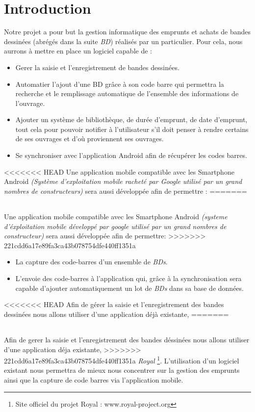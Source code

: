 \part*{Introduction}
Notre projet a pour but la gestion informatique des emprunts et achats de bandes dessinées (abrégés dans la suite \emph{BD}) réalisés par un particulier.
Pour cela, nous aurrons à mettre en place un logiciel capable de : 
\begin{itemize}
\item Gerer la saisie et l'enregistrement de bandes dessinées.
\item Automatier l'ajout d'une BD grâce à son code barre qui permettra la recherche et le remplissage automatique de l'ensemble des informations de l'ouvrage.
\item Ajouter un système de bibliothèque, de durée d'emprunt, de date d'emprunt, tout cela pour pouvoir notifier à l'utilisateur s'il doit penser à rendre certains de ses ouvrages et d'où proviennent ses ouvrages.
\item Se synchroniser avec l'application Android afin de récupérer les codes barres.
\end{itemize}

<<<<<<< HEAD
Une application mobile compatible avec les Smartphone Android \textit{(Système d'exploitation mobile racheté par Google utilisé par un grand nombres de constructeurs)} sera aussi développée afin de permettre :
=======

\paragraph{}
Une application mobile compatible avec les Smartphone Android \textit{(systeme d'éxploitation mobile développé par google utilisé par un grand nombres de constructeur)} sera aussi développée afin de permettre:
>>>>>>> 221cdd6a17e89fa3ca43b078754dfe440ff1351a
\begin{itemize}
\item La capture des code-barres d'un ensemble de \emph{BDs}.
\item L'envoie des code-barres à l'application qui, grâce à la synchronisation sera capable d'ajouter automatiquement un lot de \emph{BDs} dans sa base de données.
\end{itemize}

<<<<<<< HEAD
Afin de gérer la saisie et l'enregistrement des bandes dessinées nous allons utiliser d'une application déjà existante, 
=======
\paragraph{}
Afin de gerer la saisie et l'enregistrement des bandes déssinées nous allons utiliser d'une application déja existante, 
>>>>>>> 221cdd6a17e89fa3ca43b078754dfe440ff1351a
\emph{Royal} \footnote{Site officiel du projet Royal : www.royal-project.org}. 
L'utilisation d'un logiciel existant nous permettra de mieux nous concentrer sur la gestion des emprunts ainsi que la capture de code barres via l'application mobile.

